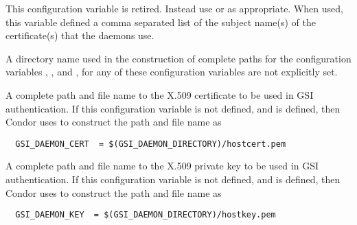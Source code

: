 \begin{description}
\label{param:SecAuthentication}
\item[\Macro{SEC\_*\_AUTHENTICATION}]
\Todo

\label{param:SecEncryption}
\item[\Macro{SEC\_*\_ENCRYPTION}]
\Todo

\label{param:SecIntegrity}
\item[\Macro{SEC\_*\_INTEGRITY}]
\Todo

\label{param:SecNegotiation}
\item[\Macro{SEC\_*\_NEGOTIATION}]
\Todo

\label{param:SecAuthenticationMethods}
\item[\Macro{SEC\_*\_AUTHENTICATION\_METHODS}]
\Todo

\label{param:SecCryptoMethods}
\item[\Macro{SEC\_*\_CRYPTO\_METHODS}]
\Todo

\label{param:GSIDaemonName}
\item[\Macro{GSI\_DAEMON\_NAME}]
  This configuration variable is retired.
  Instead use  or  as
  appropriate. When used, this variable defined
  a comma separated list of the subject
  name(s) of the certificate(s) that the daemons use.

\label{param:GSIDaemonDirectory}
\item[\Macro{GSI\_DAEMON\_DIRECTORY}]
  A directory name used in the
  construction of complete paths for the configuration variables
  ,
  , and
  ,
  for any of these configuration variables are not explicitly set.

\label{param:GSIDaemonCert}
\item[\Macro{GSI\_DAEMON\_CERT}]
  A complete path and file name to the
  X.509 certificate to be used in GSI authentication.
  If this configuration variable is not defined, and
   is defined, then Condor uses
   to construct the path and file name as
  \begin{verbatim}
  GSI_DAEMON_CERT  = $(GSI_DAEMON_DIRECTORY)/hostcert.pem
  \end{verbatim}

\label{param:GSIDaemonKey}
\item[\Macro{GSI\_DAEMON\_KEY}]
  A complete path and file name to the
  X.509 private key to be used in GSI authentication.
  If this configuration variable is not defined, and
   is defined, then Condor uses
   to construct the path and file name as
  \begin{verbatim}
  GSI_DAEMON_KEY  = $(GSI_DAEMON_DIRECTORY)/hostkey.pem
  \end{verbatim}


\end{description}
